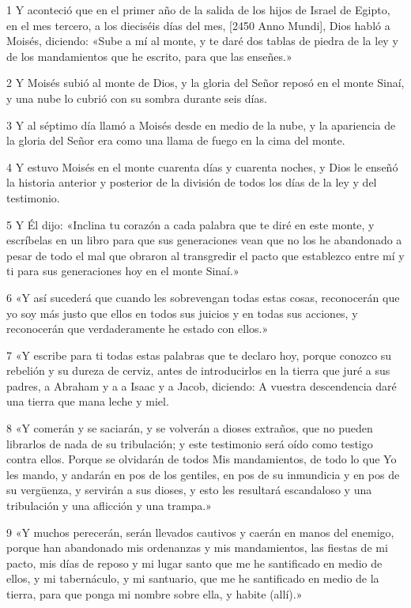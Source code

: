 \par 1 Y aconteció que en el primer año de la salida de los hijos de Israel de Egipto, en el mes tercero, a los dieciséis días del mes, [2450 Anno Mundi], Dios habló a Moisés, diciendo: «Sube a mí al monte, y te daré dos tablas de piedra de la ley y de los mandamientos que he escrito, para que las enseñes.»
\par 2 Y Moisés subió al monte de Dios, y la gloria del Señor reposó en el monte Sinaí, y una nube lo cubrió con su sombra durante seis días.
\par 3 Y al séptimo día llamó a Moisés desde en medio de la nube, y la apariencia de la gloria del Señor era como una llama de fuego en la cima del monte.
\par 4 Y estuvo Moisés en el monte cuarenta días y cuarenta noches, y Dios le enseñó la historia anterior y posterior de la división de todos los días de la ley y del testimonio.
\par 5 Y Él dijo: «Inclina tu corazón a cada palabra que te diré en este monte, y escríbelas en un libro para que sus generaciones vean que no los he abandonado a pesar de todo el mal que obraron al transgredir el pacto que establezco entre mí y ti para sus generaciones hoy en el monte Sinaí.»
\par 6 «Y así sucederá que cuando les sobrevengan todas estas cosas, reconocerán que yo soy más justo que ellos en todos sus juicios y en todas sus acciones, y reconocerán que verdaderamente he estado con ellos.»
\par 7 «Y escribe para ti todas estas palabras que te declaro hoy, porque conozco su rebelión y su dureza de cerviz, antes de introducirlos en la tierra que juré a sus padres, a Abraham y a a Isaac y a Jacob, diciendo: A vuestra descendencia daré una tierra que mana leche y miel.
\par 8 «Y comerán y se saciarán, y se volverán a dioses extraños, que no pueden librarlos de nada de su tribulación; y este testimonio será oído como testigo contra ellos. Porque se olvidarán de todos Mis mandamientos, de todo lo que Yo les mando, y andarán en pos de los gentiles, en pos de su inmundicia y en pos de su vergüenza, y servirán a sus dioses, y esto les resultará escandaloso y una tribulación y una aflicción y una trampa.»
\par 9 «Y muchos perecerán, serán llevados cautivos y caerán en manos del enemigo, porque han abandonado mis ordenanzas y mis mandamientos, las fiestas de mi pacto, mis días de reposo y mi lugar santo que me he santificado en medio de ellos, y mi tabernáculo, y mi santuario, que me he santificado en medio de la tierra, para que ponga mi nombre sobre ella, y habite (allí).»
